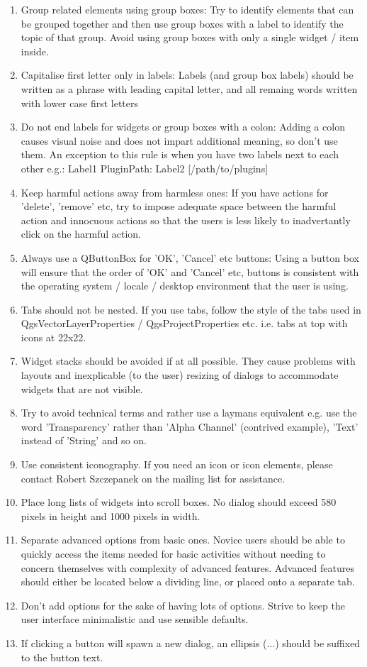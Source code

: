  \begin{enumerate}
 \item Group related elements using group boxes:
   Try to identify elements that can be grouped together and then use group
   boxes with a label to identify the topic of that group.  Avoid using group
   boxes with only a single widget / item inside.
 \item Capitalise first letter only in labels:
   Labels (and group box labels) should be written as a phrase with leading
   capital letter, and all remaing words written with lower case first letters 
 \item Do not end labels for widgets or group boxes with a colon:
   Adding a colon causes visual noise and does not impart additional meaning,
   so don't use them. An exception to this rule is when you have two labels next
   to each other e.g.: Label1 {Plugin}{Path:} Label2 [/path/to/plugins]
 \item Keep harmful actions away from harmless ones:
   If you have actions for 'delete', 'remove' etc, try to impose adequate space
   between the harmful action and innocuous actions so that the users is less
   likely to inadvertantly click on the harmful action.
 \item Always use a QButtonBox for 'OK', 'Cancel' etc buttons:
   Using a button box will ensure that the order of 'OK' and 'Cancel' etc,
   buttons is consistent with the operating system / locale / desktop
   environment that the user is using.
 \item Tabs should not be nested. If you use tabs, follow the style of the
   tabs used in QgsVectorLayerProperties / QgsProjectProperties etc.
   i.e. tabs at top with icons at 22x22.
 \item Widget stacks should be avoided if at all possible. They cause problems with 
   layouts and inexplicable (to the user) resizing of dialogs to accommodate 
   widgets that are not visible.
 \item Try to avoid technical terms and rather use a laymans equivalent e.g. use
   the word 'Transparency' rather than 'Alpha Channel' (contrived example),
   'Text' instead of 'String' and so on.
 \item Use consistent iconography. If you need an icon or icon elements, please
   contact Robert Szczepanek on the mailing list for assistance.
 \item Place long lists of widgets into scroll boxes. No dialog should exceed 580
   pixels in height and 1000 pixels in width.
 \item Separate advanced options from basic ones. Novice users should be able to
   quickly access the items needed for basic activities without needing to
   concern themselves with complexity of advanced features. Advanced features
   should either be located below a dividing line, or placed onto a separate tab.
 \item Don't add options for the sake of having lots of options. Strive to keep the
   user interface minimalistic and use sensible defaults.
 \item If clicking a button will spawn a new dialog, an ellipsis (...) should be
   suffixed to the button text.
 \end{enumerate}


